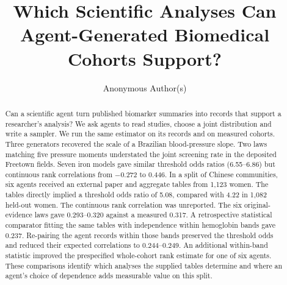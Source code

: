 \documentclass[sigconf,anonymous,review]{acmart}
\begin{document}
\title[Which Analyses Can Agent-Generated Cohorts Support?]{Which Scientific Analyses Can Agent-Gener\-ated Biomedical Cohorts Support?}
\author{Anonymous Author(s)}

\begin{abstract}
Can a scientific agent turn published biomarker summaries into records that support a researcher's analysis? We ask agents to read studies, choose a joint distribution and write a sampler. We run the same estimator on its records and on measured cohorts. Three generators recovered the scale of a Brazilian blood-pressure slope. Two laws matching five pressure moments understated the joint screening rate in the deposited Freetown fields. Seven iron models gave similar threshold odds ratios (6.55--6.86) but continuous rank correlations from $-0.272$ to $0.446$. In a split of Chinese communities, six agents received an external paper and aggregate tables from 1,123 women. The tables directly implied a threshold odds ratio of 5.08, compared with 4.22 in 1,082 held-out women. The continuous rank correlation was unreported. The six original-evidence laws gave 0.293--0.320 against a measured 0.317. A retrospective statistical comparator fitting the same tables with independence within hemoglobin bands gave 0.237. Re-pairing the agent records within those bands preserved the threshold odds and reduced their expected correlations to 0.244--0.249. An additional within-band statistic improved the prespecified whole-cohort rank estimate for one of six agents. These comparisons identify which analyses the supplied tables determine and where an agent's choice of dependence adds measurable value on this split.
\end{abstract}

\maketitle
\end{document}
